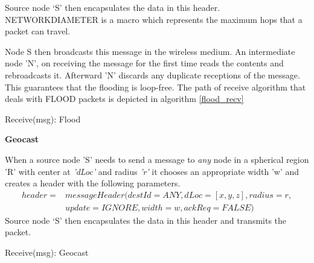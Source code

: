 Source node `S' then encapsulates the data in this header. NETWORK\textunderscore DIAMETER is a macro which represents the maximum hops that a packet can travel. 

Node S then broadcasts this message in the wireless medium. An intermediate node 'N', on receiving the message for the first time reads the contents and rebroadcasts it. Afterward 'N' discards any duplicate receptions of the message. This guarantees that the flooding is loop-free.
The path of receive algorithm that deals with FLOOD packets is depicted in algorithm \ref{flood_recv}


\begin{algorithm}
\caption{Receive(msg): Flood} 
\label{flood_recv}
\DontPrintSemicolon
{}

\end{algorithm}


\textbf{Geocast}


When a source node 'S' needs to send a message to \emph{any} node in a spherical region 'R' with center at \emph{'dLoc'} and radius \emph{'r'} it chooses an appropriate width 'w' and creates a header with the following parameters.
\begin{eqnarray*}
header = & messageHeader(destId = ANY, dLoc = [x,y,z], radius = r,\\
    & update = IGNORE, width = w, ackReq = FALSE)
\end{eqnarray*}
Source node `S' then encapsulates the data in this header and transmits the packet.

\begin{algorithm}
\SetAlgoLined
\DontPrintSemicolon
{}


\caption{Receive(msg): Geocast} \label{geocast_recv}
\end{algorithm}

